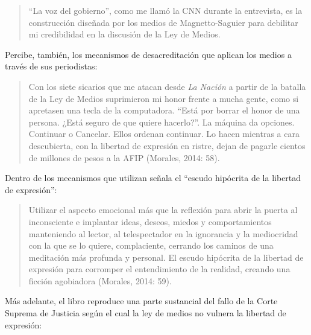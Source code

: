 \begin{quote}
\enquote{La voz del gobierno}, como me llamó la CNN durante la entrevista, es la construcción diseñada por los medios de Magnetto-Saguier para debilitar mi credibilidad en la discusión de la Ley de Medios.
\end{quote}

Percibe, también, los mecanismos de desacreditación que aplican los medios a través de sus periodistas:

\begin{quote}
Con los siete sicarios que me atacan desde \emph{La Nación} a partir de la batalla de la Ley de Medios suprimieron mi honor frente a mucha gente, como si apretasen una tecla de la computadora. \enquote{Está por borrar el honor de una persona. ¿Está seguro de que quiere hacerlo?}. La máquina da opciones. Continuar o Cancelar. Ellos ordenan continuar. Lo hacen mientras a cara descubierta, con la libertad de expresión en ristre, dejan de pagarle cientos de millones de pesos a la AFIP (Morales, 2014: 58).
\end{quote}

Dentro de los mecanismos que utilizan señala el \enquote{escudo hipócrita de la libertad de expresión}:

\begin{quote}
Utilizar el aspecto emocional más que la reflexión para abrir la puerta al inconsciente e implantar ideas, deseos, miedos y comportamientos manteniendo al lector, al telespectador en la ignorancia y la mediocridad con la que se lo quiere, complaciente, cerrando los caminos de una meditación más profunda y personal. El escudo hipócrita de la libertad de expresión para corromper el entendimiento de la realidad, creando una ficción agobiadora (Morales, 2014: 59).
\end{quote}

Más adelante, el libro reproduce una parte sustancial del fallo de la Corte Suprema de Justicia según el cual la ley de medios no vulnera la libertad de expresión:


